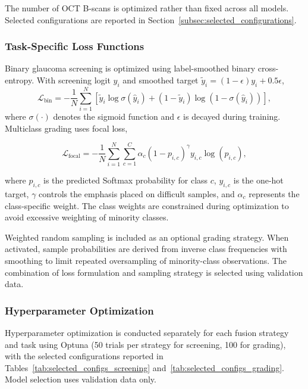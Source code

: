 \documentclass{ieeeaccess}
\begin{document}
The number of OCT B-scans is optimized rather than fixed across all models. Selected configurations are reported in Section~\ref{subsec:selected_configurations}.

\subsubsection{Task-Specific Loss Functions}
\label{subsubsec:loss_functions}

Binary glaucoma screening is optimized using label-smoothed binary cross-entropy. With screening logit $\hat{y}_i$ and smoothed target $\tilde{y}_i=(1-\epsilon)y_i+0.5\epsilon$,
\begin{equation}
    \mathcal{L}_{\mathrm{bin}}
    =
    -\frac{1}{N}\sum_{i=1}^{N}
    \left[
        \tilde{y}_i\log\sigma(\hat{y}_i)
        +
        (1-\tilde{y}_i)\log\!\left(1-\sigma(\hat{y}_i)\right)
        \right],
    \label{eq:binary_loss}
\end{equation}
where $\sigma(\cdot)$ denotes the sigmoid function and $\epsilon$ is decayed during training. Multiclass grading uses focal loss,

\begin{equation}
    \mathcal{L}_{\mathrm{focal}}
    =
    -\frac{1}{N}
    \sum_{i=1}^{N}
    \sum_{c=1}^{C}
    \alpha_c
    \left(1-p_{i,c}\right)^{\gamma}
    y_{i,c}\log(p_{i,c}),
    \label{eq:focal_loss}
\end{equation}

where $p_{i,c}$ is the predicted Softmax probability for class $c$, $y_{i,c}$ is the one-hot target, $\gamma$ controls the emphasis placed on difficult samples, and $\alpha_c$ represents the class-specific weight. The class weights are constrained during optimization to avoid excessive weighting of minority classes.

Weighted random sampling is included as an optional grading strategy. When activated, sample probabilities are derived from inverse class frequencies with smoothing to limit repeated oversampling of minority-class observations. The combination of loss formulation and sampling strategy is selected using validation data.

\subsubsection{Hyperparameter Optimization}
\label{subsubsec:hyperparameter_optimization}

Hyperparameter optimization is conducted separately for each fusion strategy and task using Optuna (50 trials per strategy for screening, 100 for grading), with the selected configurations reported in Tables~\ref{tab:selected_configs_screening} and~\ref{tab:selected_configs_grading}. Model selection uses validation data only.
\end{document}
